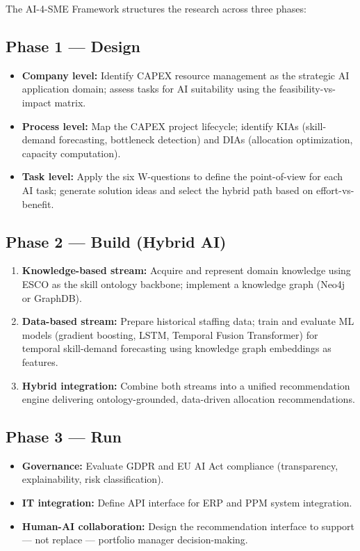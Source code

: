 The AI-4-SME Framework \parencite{peter2025ai4sme} structures the research across three phases:

\subsection*{Phase 1 — Design}

\begin{itemize}
  \item \textbf{Company level:} Identify CAPEX resource management as the strategic AI
        application domain; assess tasks for AI suitability using the feasibility-vs-impact
        matrix.
  \item \textbf{Process level:} Map the CAPEX project lifecycle; identify KIAs
        (skill-demand forecasting, bottleneck detection) and DIAs (allocation optimization,
        capacity computation).
  \item \textbf{Task level:} Apply the six W-questions to define the point-of-view for each
        AI task; generate solution ideas and select the hybrid path based on effort-vs-benefit.
\end{itemize}

\subsection*{Phase 2 — Build (Hybrid AI)}

\begin{enumerate}
  \item \textbf{Knowledge-based stream:} Acquire and represent domain knowledge using ESCO
        as the skill ontology backbone; implement a knowledge graph (Neo4j or GraphDB).
  \item \textbf{Data-based stream:} Prepare historical staffing data; train and evaluate ML
        models (gradient boosting, LSTM, Temporal Fusion Transformer) for temporal
        skill-demand forecasting using knowledge graph embeddings as features.
  \item \textbf{Hybrid integration:} Combine both streams into a unified recommendation
        engine delivering ontology-grounded, data-driven allocation recommendations.
\end{enumerate}

\subsection*{Phase 3 — Run}

\begin{itemize}
  \item \textbf{Governance:} Evaluate GDPR and EU AI Act compliance (transparency,
        explainability, risk classification).
  \item \textbf{IT integration:} Define API interface for ERP and PPM system integration.
  \item \textbf{Human-AI collaboration:} Design the recommendation interface to support —
        not replace — portfolio manager decision-making.
\end{itemize}

